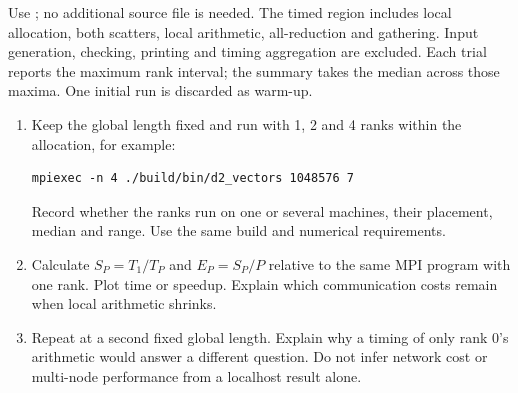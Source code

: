 Use ; no additional source file is needed. The timed region
includes local allocation, both scatters, local arithmetic, all-reduction and
gathering. Input generation, checking, printing and timing aggregation are excluded.
Each trial reports the maximum rank interval; the summary takes the median across
those maxima. One initial run is discarded as warm-up.
\begin{enumerate}
\item Keep the global length fixed and run with 1, 2 and 4 ranks within the
allocation, for example:
\begin{lstlisting}[style=shell]
mpiexec -n 4 ./build/bin/d2_vectors 1048576 7
\end{lstlisting}
Record whether the ranks run on one or several machines, their placement, median
and range. Use the same build and numerical requirements.
\item Calculate $S_P=T_1/T_P$ and $E_P=S_P/P$ relative to the same MPI program
with one rank. Plot time or speedup. Explain which communication costs remain
when local arithmetic shrinks.
\item Repeat at a second fixed global length. Explain why a timing of only
rank 0's arithmetic would answer a different question. Do not infer network cost
or multi-node performance from a localhost result alone.
\end{enumerate}
